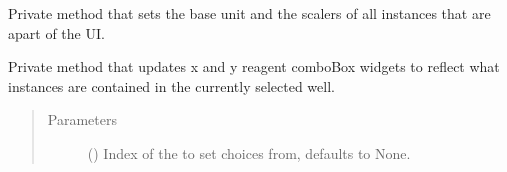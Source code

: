 \documentclass[letterpaper,10pt,english]{sphinxmanual}
\begin{document}
\begin{fulllineitems}
\begin{fulllineitems}
\begin{quote}
\begin{description}
\end{description}\end{quote}

\end{fulllineitems}


\begin{fulllineitems}
\label{\detokenize{polo.widgets:polo.widgets.optimize_widget.OptimizeWidget._set_up_unit_comboboxes}}
Private method that sets the base unit and the scalers
of all  instances that are apart of the UI.

\end{fulllineitems}


\begin{fulllineitems}
\label{\detokenize{polo.widgets:polo.widgets.optimize_widget.OptimizeWidget._update_current_reagents}}
Private method that updates x and y reagent comboBox widgets to 
reflect what  instances are contained in the
currently selected well.
\begin{quote}\begin{description}
\item[{Parameters}] \leavevmode
{} (\sphinxstyleliteralemphasis{\sphinxupquote{, }}) \textendash{} Index of the  to set  choices from,
defaults to None.

\end{description}\end{quote}

\end{fulllineitems}



\end{fulllineitems}
\end{document}
